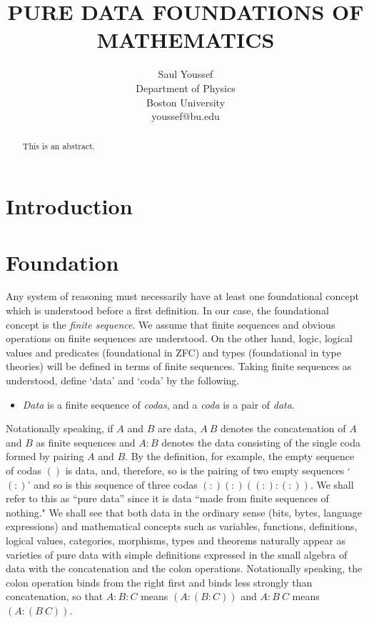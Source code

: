 \documentclass[11pt]{article}
\begin{document}
\title{\bf {PURE DATA FOUNDATIONS OF MATHEMATICS}}
\author{%
  Saul Youssef%
  \hfil \\
  Department of Physics \\
  Boston University \\
  youssef@bu.edu\\
}
\maketitle
\begin{abstract}
This is an abstract.
\end{abstract}

\section{Introduction}

\section{Foundation}

     Any system of reasoning must necessarily have at least one foundational concept which is understood before a first definition.  In our case, the foundational concept is the {\it finite sequence}.  We assume that finite sequences and obvious operations on finite sequences are understood.  On the other hand, logic, logical values and predicates (foundational in ZFC) and types (foundational in type theories) will be defined in terms of finite sequences.
Taking finite sequences as understood, define `data' and `coda' by the following.
\begin{itemize}
\item {\it Data} is a finite sequence of {\it codas}, and a {\it coda} is a pair of {\it data}. 
\end{itemize}
Notationally speaking, if $A$ and $B$ are data, $A\ B$ denotes the concatenation of $A$ and $B$ as finite sequences and $A:B$ denotes the data
consisting of the single coda formed by pairing $A$ and $B$.  By the definition, for example, the empty sequence of codas $()$ is data, and, therefore,
so is the pairing of two empty sequences `$(:)$' and so is this sequence of three codas $(:) (:) ((:):(:))$.  We shall refer to this as ``pure data'' 
since it is data ``made from finite sequences of nothing."    
We shall see that both data in the ordinary sense (bits, bytes, language expressions) and mathematical concepts such as variables, functions, definitions, logical values, categories, morphisms, types and theorems naturally appear as varieties of pure data with simple definitions expressed in the small algebra
of data with the concatenation and the colon operations.   Notationally speaking, the colon operation binds from the right first and binds 
less strongly than concatenation, so that
 $A:B:C$ means $(A:(B:C))$ and $A:B\ C$ means $(A:(B\ C))$.
\end{document}

